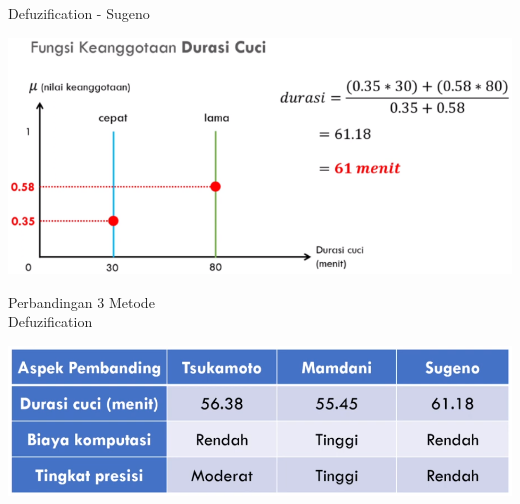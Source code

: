 \documentclass[pdflatex,compress,mathserif]{beamer}
\begin{document}
\begin{frame}{Defuzification - Sugeno}
	\begin{center}
		\includegraphics[width=\linewidth]{img/47}
	\end{center}
\end{frame}

\begin{frame}{Perbandingan 3 Metode\\Defuzification}
	\begin{center}
		\includegraphics[width=\linewidth]{img/48}
	\end{center}
\end{frame}
\end{document}
